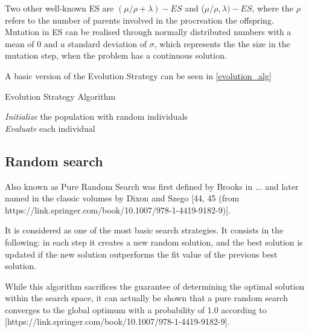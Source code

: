 Two other well-known ES are $(\mu/\rho + \lambda) - ES$ and ($\mu/\rho, \lambda) - ES$, where the $\rho$ refers to the number of parents involved in the procreation the offspring. Mutation in ES can be realised through normally distributed numbers with a mean of $0$ and $a$ standard deviation of $\sigma$, which represents the the size in the mutation step, when the problem has a continuous solution.

A basic version of the Evolution Strategy can be seen in \ref{evolution_alg}

\begin{algorithm}[H]
\label{evolution_alg}
\caption{Evolution Strategy Algorithm}
\SetAlgoLined
    \textit{Initialize} the population with random individuals\;\\
    \textit{Evaluate} each individual
\end{algorithm}

\subsection{Random search} 

Also known as Pure Random Search was first defined by Brooks in ... 
and later named in the classic volumes by Dixon and Szego [44, 45 (from  https://link.springer.com/book/10.1007/978-1-4419-9182-9)].

It is considered as one of the most basic search strategies. It consists in the following: in each step it creates a new random solution, and the best solution is updated if the new solution outperforms the fit value of the previous best solution.

While this algorithm sacrifices the guarantee of determining the optimal solution within the search space, it can actually be shown that a pure random search converges to the global optimum with a probability of 1.0 according to [https://link.springer.com/book/10.1007/978-1-4419-9182-9].

